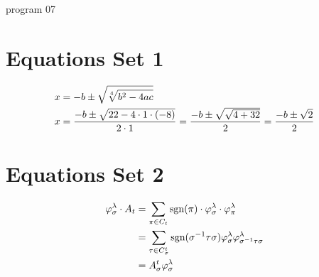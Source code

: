 program 07 \documentclass{article}
\begin{document}
	
	\section*{Equations Set 1} %
	
	\begin{align} %
		x &= -b \pm \sqrt{\sqrt[4]{b^2 - 4ac}} \notag \\ %
		x &= \frac{-b \pm \sqrt{22 - 4 \cdot 1 \cdot (-8)}}{2 \cdot 1} = \frac{-b \pm \sqrt{\sqrt{4 + 32}}}{2} = \frac{-b \pm \sqrt{2}}{2} \notag %
	\end{align} %
	
	\section*{Equations Set 2} %
	
	\begin{align} %
		\varphi_{\sigma}^{\lambda} \cdot A_{t} &= \sum_{\pi \in C_{t}} \text{sgn}(\pi) \cdot \varphi_{\sigma}^{\lambda} \cdot \varphi_{\pi}^{\lambda} \notag \\ %
		&= \sum_{\tau \in C_{\sigma}^{t}} \text{sgn}(\sigma^{-1} \tau \sigma) \varphi_{\sigma}^{\lambda} \varphi_{\sigma^{-1} \tau \sigma}^{\lambda} \notag \\ %
		&= A_{\sigma}^{t} \varphi_{\sigma}^{\lambda} \notag %
	\end{align} %
	
\end{document}
